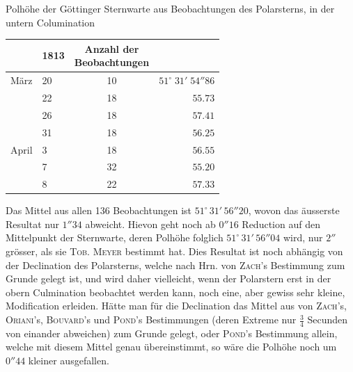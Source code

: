 \begin{center}Polhöhe der Göttinger Sternwarte aus Beobachtungen des Polarsterns, in der untern Columination\end{center}
\begin{center}\fontsize{10}{12}\selectfont\setlength{\tabcolsep}{7pt}\renewcommand{\arraystretch}{1.15}\begin{tabular}{ll|c|r}
& 1813 & \shortstack{Anzahl der\\Beobachtungen} &\\\hline
März & 20 & 10 & $51^\circ\;31'\;54''86$\\
& 22 & 18 & $55.73$\\
& 26 & 18 & $57.41$\\
& 31 & 18 & $56.25$\\
April & 3 & 18 & $56.55$\\
& 7 & 32 & $55.20$\\
& 8 & 22 & $57.33$\\
\end{tabular}\end{center}

\par\indent{}Das Mittel aus allen 136 Beobachtungen ist $51^\circ\,31'\,56''20$, wovon das äusserste Resultat nur $1''34$ abweicht. Hievon geht noch ab $0''16$ Reduction auf den Mittelpunkt der Sternwarte, deren Polhöhe folglich $51^\circ\,31'\,56''04$ wird, nur $2''$ grösser, als sie \textsc{Tob. Meyer} bestimmt hat. Dies Resultat ist noch abhängig von der Declination des Polarsterns, welche nach Hrn. von \textsc{Zach}'s Bestimmung zum Grunde gelegt ist, und wird daher vielleicht, wenn der Polarstern erst in der obern Culmination beobachtet werden kann, noch eine, aber gewiss sehr kleine, Modification erleiden. Hätte man für die Declination das Mittel aus von \textsc{Zach}'s, \textsc{Oriani}'s, \textsc{Bouvard}'s und \textsc{Pond}'s Bestimmungen (deren Extreme nur $\frac{3}{4}$ Secunden von einander abweichen) zum Grunde gelegt, oder \textsc{Pond}'s Bestimmung allein, welche mit diesem Mittel genau übereinstimmt, so wäre die Polhöhe noch um $0''44$ kleiner ausgefallen.

